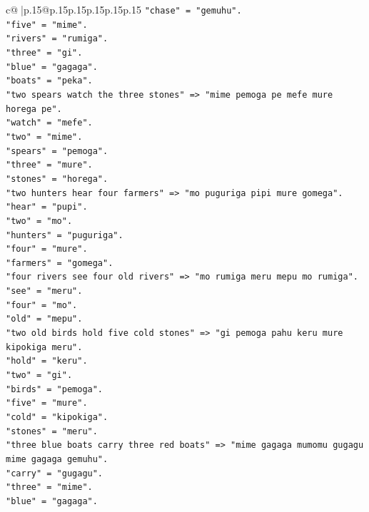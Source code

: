 \documentclass{article}
\begin{document}
{\begin{supertabular}{c@{$\;$}|p{.15\linewidth}@{}p{.15\linewidth}p{.15\linewidth}p{.15\linewidth}p{.15\linewidth}p{.15\linewidth}}
{{{\texttt{"chase" = "gemuhu".} \\
\texttt{"five" = "mime".} \\
\texttt{"rivers" = "rumiga".} \\
\texttt{"three" = "gi".} \\
\texttt{"blue" = "gagaga".} \\
\texttt{"boats" = "peka".} \\
\texttt{"two spears watch the three stones" => "mime pemoga pe mefe mure horega pe".} \\
\texttt{"watch" = "mefe".} \\
\texttt{"two" = "mime".} \\
\texttt{"spears" = "pemoga".} \\
\texttt{"three" = "mure".} \\
\texttt{"stones" = "horega".} \\
\texttt{"two hunters hear four farmers" => "mo puguriga pipi mure gomega".} \\
\texttt{"hear" = "pupi".} \\
\texttt{"two" = "mo".} \\
\texttt{"hunters" = "puguriga".} \\
\texttt{"four" = "mure".} \\
\texttt{"farmers" = "gomega".} \\
\texttt{"four rivers see four old rivers" => "mo rumiga meru mepu mo rumiga".} \\
\texttt{"see" = "meru".} \\
\texttt{"four" = "mo".} \\
\texttt{"old" = "mepu".} \\
\texttt{"two old birds hold five cold stones" => "gi pemoga pahu keru mure kipokiga meru".} \\
\texttt{"hold" = "keru".} \\
\texttt{"two" = "gi".} \\
\texttt{"birds" = "pemoga".} \\
\texttt{"five" = "mure".} \\
\texttt{"cold" = "kipokiga".} \\
\texttt{"stones" = "meru".} \\
\texttt{"three blue boats carry three red boats" => "mime gagaga mumomu gugagu mime gagaga gemuhu".} \\
\texttt{"carry" = "gugagu".} \\
\texttt{"three" = "mime".} \\
\texttt{"blue" = "gagaga".} \\
}}}
\end{supertabular}}
\end{document}
